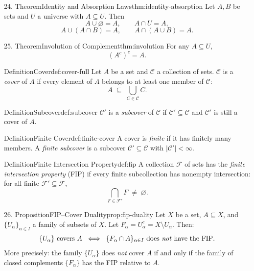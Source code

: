\documentclass[11pt]{article}
\begin{document}
\begin{studyblock}{24. Theorem}{Identity and Absorption Laws}{thm:identity-absorption}
Let $A,B$ be sets and $U$ a universe with $A \subseteq U$. Then
\[
A \cup \varnothing = A,
\qquad
A \cap U = A,
\]
\[
A \cup (A \cap B) = A,
\qquad
A \cap (A \cup B) = A.
\]
\end{studyblock}
\begin{studyblock}{25. Theorem}{Involution of Complement}{thm:involution}
For any $A \subseteq U$,
\[
(A^c)^c = A.
\]
\end{studyblock}
\begin{studyblock}{Definition}{Cover}{def:cover-full}
Let $A$ be a set and $\mathcal{C}$ a collection of sets.
$\mathcal{C}$ is a \emph{cover} of $A$ if every element of $A$ belongs to
at least one member of $\mathcal{C}$:
\[
A \;\subseteq\; \bigcup_{C \in \mathcal{C}} C.
\]
\end{studyblock}
\begin{studyblock}{Definition}{Subcover}{def:subcover}
$\mathcal{C}'$ is a \emph{subcover} of $\mathcal{C}$ if $\mathcal{C}'
\subseteq \mathcal{C}$ and $\mathcal{C}'$ is still a cover of $A$.
\end{studyblock}
\begin{studyblock}{Definition}{Finite Cover}{def:finite-cover}
A cover is \emph{finite} if it has finitely many members. A \emph{finite
subcover} is a subcover $\mathcal{C}' \subseteq \mathcal{C}$ with
$|\mathcal{C}'| < \infty$.
\end{studyblock}
\begin{studyblock}{Definition}{Finite Intersection Property}{def:fip}
A collection $\mathcal{F}$ of sets has the \emph{finite intersection
property} (FIP) if every finite subcollection has nonempty intersection:
for all finite $\mathcal{F}' \subseteq \mathcal{F}$,
\[
\bigcap_{F \in \mathcal{F}'} F \;\neq\; \varnothing.
\]
\end{studyblock}
\begin{studyblock}{26. Proposition}{FIP--Cover Duality}{prop:fip-duality}
Let $X$ be a set, $A \subseteq X$, and $\{U_\alpha\}_{\alpha \in I}$ a
family of subsets of $X$. Let $F_\alpha = U_\alpha^c = X \setminus U_\alpha$.
Then:
\[
\{U_\alpha\} \text{ covers } A
\;\;\Longleftrightarrow\;\;
\{F_\alpha \cap A\}_{\alpha \in I} \text{ does \emph{not} have the FIP}.
\]
More precisely: the family $\{U_\alpha\}$ does \emph{not} cover $A$ if and
only if the family of closed complements $\{F_\alpha\}$ has the FIP relative
to $A$.
\end{studyblock}
\end{document}
